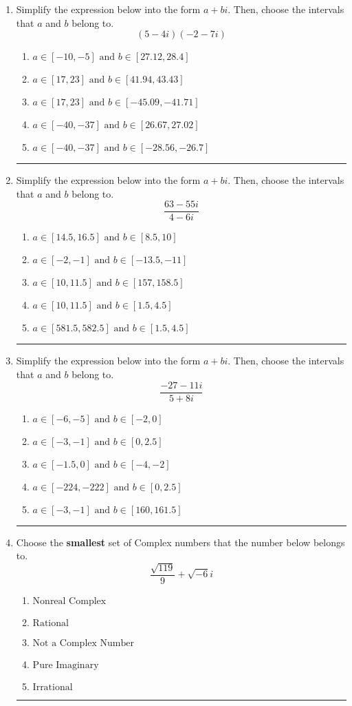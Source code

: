 \documentclass[14pt]{extbook}
\newcommand{\litem}[1]{\item#1\hspace*{-1cm}\rule{\textwidth}{0.4pt}}
\begin{document}
\begin{enumerate}
{\begin{enumerate}[label=\Alph*.]
\end{enumerate} }
\litem{
Simplify the expression below into the form $a+bi$. Then, choose the intervals that $a$ and $b$ belong to.\[ (5 - 4 i)(-2 - 7 i) \]\begin{enumerate}[label=\Alph*.]
\item \( a \in [-10, -5] \text{ and } b \in [27.12, 28.4] \)
\item \( a \in [17, 23] \text{ and } b \in [41.94, 43.43] \)
\item \( a \in [17, 23] \text{ and } b \in [-45.09, -41.71] \)
\item \( a \in [-40, -37] \text{ and } b \in [26.67, 27.02] \)
\item \( a \in [-40, -37] \text{ and } b \in [-28.56, -26.7] \)

\end{enumerate} }
\litem{
Simplify the expression below into the form $a+bi$. Then, choose the intervals that $a$ and $b$ belong to.\[ \frac{63 - 55 i}{4 - 6 i} \]\begin{enumerate}[label=\Alph*.]
\item \( a \in [14.5, 16.5] \text{ and } b \in [8.5, 10] \)
\item \( a \in [-2, -1] \text{ and } b \in [-13.5, -11] \)
\item \( a \in [10, 11.5] \text{ and } b \in [157, 158.5] \)
\item \( a \in [10, 11.5] \text{ and } b \in [1.5, 4.5] \)
\item \( a \in [581.5, 582.5] \text{ and } b \in [1.5, 4.5] \)

\end{enumerate} }
\litem{
Simplify the expression below into the form $a+bi$. Then, choose the intervals that $a$ and $b$ belong to.\[ \frac{-27 - 11 i}{5 + 8 i} \]\begin{enumerate}[label=\Alph*.]
\item \( a \in [-6, -5] \text{ and } b \in [-2, 0] \)
\item \( a \in [-3, -1] \text{ and } b \in [0, 2.5] \)
\item \( a \in [-1.5, 0] \text{ and } b \in [-4, -2] \)
\item \( a \in [-224, -222] \text{ and } b \in [0, 2.5] \)
\item \( a \in [-3, -1] \text{ and } b \in [160, 161.5] \)

\end{enumerate} }
\litem{
Choose the \textbf{smallest} set of Complex numbers that the number below belongs to.\[ \frac{\sqrt{119}}{9}+\sqrt{-6}i \]\begin{enumerate}[label=\Alph*.]
\item \( \text{Nonreal Complex} \)
\item \( \text{Rational} \)
\item \( \text{Not a Complex Number} \)
\item \( \text{Pure Imaginary} \)
\item \( \text{Irrational} \)


\end{enumerate}}
\end{enumerate}
\end{document}
